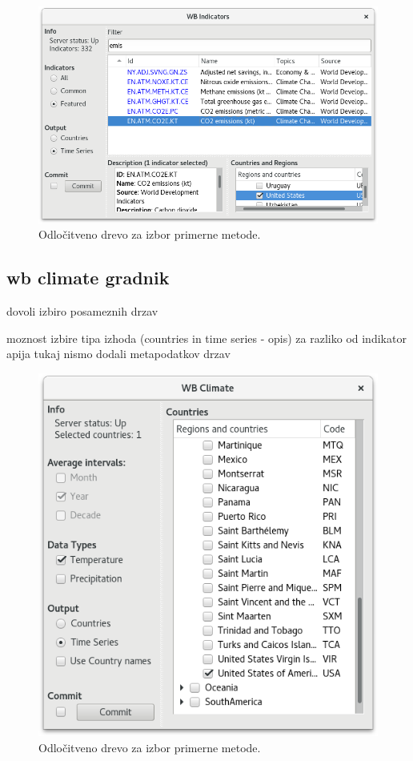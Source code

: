 \begin{figure}
\begin{center}
\includegraphics[width=12cm]{pic/co2_temp_indicator_selection.png}
\end{center}
\caption{Odločitveno drevo za izbor primerne metode.}
\label{co2_temp_indicator}
\end{figure} 



\subsection{wb climate gradnik}

dovoli izbiro posameznih drzav 

moznost izbire tipa izhoda (countries in time series - opis)
za razliko od indikator apija tukaj nismo dodali metapodatkov drzav 



\begin{figure}
\begin{center}
\includegraphics[width=12cm]{pic/co2_temp_climate_selection.png}
\end{center}
\caption{Odločitveno drevo za izbor primerne metode.}
\label{co2_temp_indicator}
\end{figure} 
